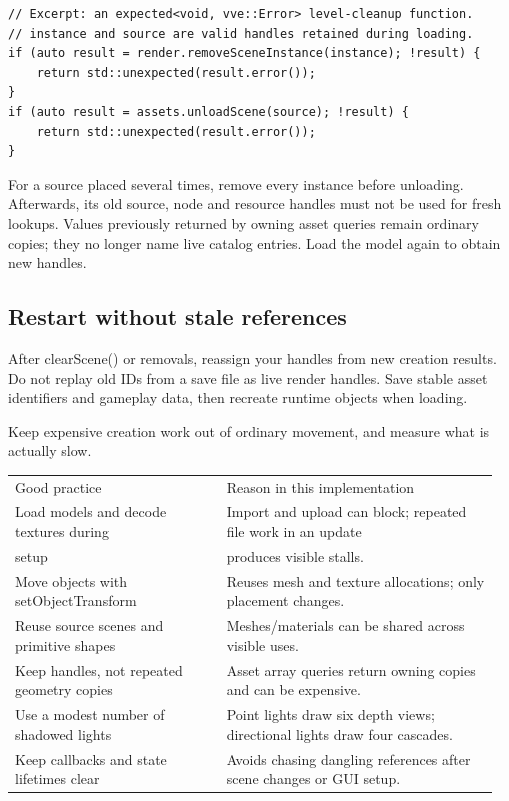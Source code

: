 \documentclass[11pt,a4paper]{article}
\begin{document}
\begin{lstlisting}
// Excerpt: an expected<void, vve::Error> level-cleanup function.
// instance and source are valid handles retained during loading.
if (auto result = render.removeSceneInstance(instance); !result) {
    return std::unexpected(result.error());
}
if (auto result = assets.unloadScene(source); !result) {
    return std::unexpected(result.error());
}
\end{lstlisting}
For a source placed several times, remove every instance before unloading. Afterwards, its old source, node and resource handles must not be used for fresh lookups. Values previously returned by owning asset queries remain ordinary copies; they no longer name live catalog entries. Load the model again to obtain new handles.

\subsection*{Restart without stale references}
After clearScene() or removals, reassign your handles from new creation results. Do not replay old IDs from a save file as live render handles. Save stable asset identifiers and gameplay data, then recreate runtime objects when loading.

\label{core-72}
Keep expensive creation work out of ordinary movement, and measure what is actually slow.

{\small
\begin{longtable}{@{}p{0.42\linewidth}p{0.54\linewidth}@{}}
Good practice & Reason in this implementation \\
Load models and decode textures during & Import and upload can block; repeated file work in an update \\
setup & produces visible stalls. \\
Move objects with setObjectTransform & Reuses mesh and texture allocations; only placement changes. \\
Reuse source scenes and primitive shapes & Meshes/materials can be shared across visible uses. \\
Keep handles, not repeated geometry copies & Asset array queries return owning copies and can be expensive. \\
Use a modest number of shadowed lights & Point lights draw six depth views; directional lights draw four cascades. \\
Keep callbacks and state lifetimes clear & Avoids chasing dangling references after scene changes or GUI setup. \\
\end{longtable}
}
\end{document}
